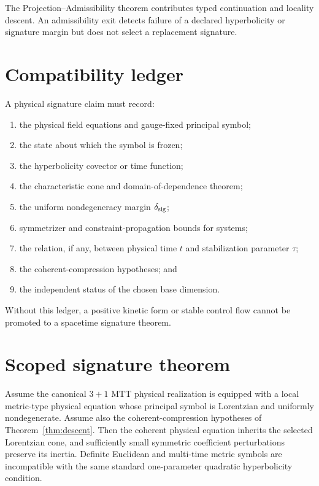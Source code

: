 \documentclass[11pt]{article}
\begin{document}
The Projection--Admissibility theorem contributes typed continuation and
locality descent. An admissibility exit detects failure of a declared
hyperbolicity or signature margin but does not select a replacement signature.

\section{Compatibility ledger}

A physical signature claim must record:
\begin{enumerate}
\item the physical field equations and gauge-fixed principal symbol;
\item the state about which the symbol is frozen;
\item the hyperbolicity covector or time function;
\item the characteristic cone and domain-of-dependence theorem;
\item the uniform nondegeneracy margin $\delta_{\rm sig}$;
\item symmetrizer and constraint-propagation bounds for systems;
\item the relation, if any, between physical time $t$ and stabilization
parameter $\tau$;
\item the coherent-compression hypotheses; and
\item the independent status of the chosen base dimension.
\end{enumerate}

Without this ledger, a positive kinetic form or stable control flow cannot be
promoted to a spacetime signature theorem.

\section{Scoped signature theorem}

\begin{theorem}\label{thm:scope}
Assume the canonical $3+1$ MTT physical realization is equipped with a local
metric-type physical equation whose principal symbol is Lorentzian and
uniformly nondegenerate. Assume also the coherent-compression hypotheses of
Theorem~\ref{thm:descent}. Then the coherent physical equation inherits the
selected Lorentzian cone, and sufficiently small symmetric coefficient
perturbations preserve its inertia. Definite Euclidean and multi-time metric
symbols are incompatible with the same standard one-parameter quadratic
hyperbolicity condition.
\end{theorem}
\end{document}
